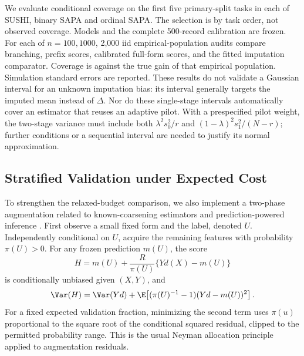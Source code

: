 We evaluate conditional coverage on the first five primary-split tasks
in each of SUSHI, binary SAPA and ordinal SAPA. The selection is by task
order, not observed coverage. Models and the complete 500-record
calibration are frozen. For each of $n=100,1000$, 2,000 iid empirical-population
audits compare branching, prefix scores, calibrated full-form scores,
and the fitted imputation comparator. Coverage is against the true gain of
that empirical population. Simulation standard errors are reported.
These results do not validate a Gaussian interval for an unknown imputation
bias: its interval generally targets the imputed mean instead of $\Delta$.
Nor do these single-stage intervals automatically cover an estimator that
reuses an adaptive pilot. With a prespecified pilot weight, the two-stage
variance must include both $\lambda^2s_0^2/r$ and
$(1-\lambda)^2s_1^2/(N-r)$; further conditions or a sequential interval are
needed to justify its normal approximation.



\subsection{Stratified Validation under Expected Cost}\label{app:validation}
To strengthen the relaxed-budget comparison, we also implement a two-phase
augmentation related to known-coarsening estimators and prediction-powered
inference \citep{robins1994,tao2020,ppi2024}. First observe a small fixed form
and the label, denoted $U$. Independently conditional on $U$, acquire the
remaining features with probability $\pi(U)>0$. For any frozen prediction
$m(U)$, the score
\[
          H=m(U)+\frac{R}{\pi(U)}\{Yd(X)-m(U)\}
\]
is conditionally unbiased given $(X,Y)$, and
\[
 \Var(H)=\Var(Yd)+\E\!\left[(\pi(U)^{-1}-1)(Yd-m(U))^2\right].
\]
For a fixed expected validation fraction, minimizing the second term uses
$\pi(u)$ proportional to the square root of the conditional squared
residual, clipped to the permitted probability range. This is the usual
Neyman allocation principle applied to augmentation residuals.

